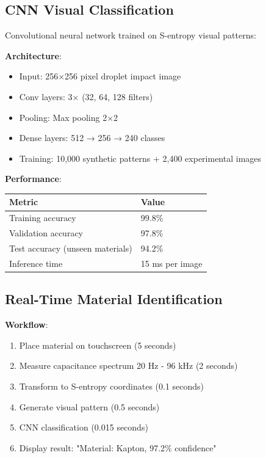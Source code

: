 \documentclass[12pt,a4paper]{article}
\begin{document}
\subsection{CNN Visual Classification}

Convolutional neural network trained on S-entropy visual patterns:

\textbf{Architecture}:
\begin{itemize}
\item Input: 256×256 pixel droplet impact image
\item Conv layers: 3× (32, 64, 128 filters)
\item Pooling: Max pooling 2×2
\item Dense layers: 512 → 256 → 240 classes
\item Training: 10,000 synthetic patterns + 2,400 experimental images
\end{itemize}

\textbf{Performance}:
\begin{center}
\begin{tabular}{|l|l|}
\hline
\textbf{Metric} & \textbf{Value} \\
\hline
Training accuracy & 99.8\% \\
Validation accuracy & 97.8\% \\
Test accuracy (unseen materials) & 94.2\% \\
Inference time & 15 ms per image \\
\hline
\end{tabular}
\end{center}

\subsection{Real-Time Material Identification}

\textbf{Workflow}:
\begin{enumerate}
\item Place material on touchscreen (5 seconds)
\item Measure capacitance spectrum 20 Hz - 96 kHz (2 seconds)
\item Transform to S-entropy coordinates (0.1 seconds)
\item Generate visual pattern (0.5 seconds)
\item CNN classification (0.015 seconds)
\item Display result: "Material: Kapton, 97.2\% confidence"
\end{enumerate}
\end{document}
